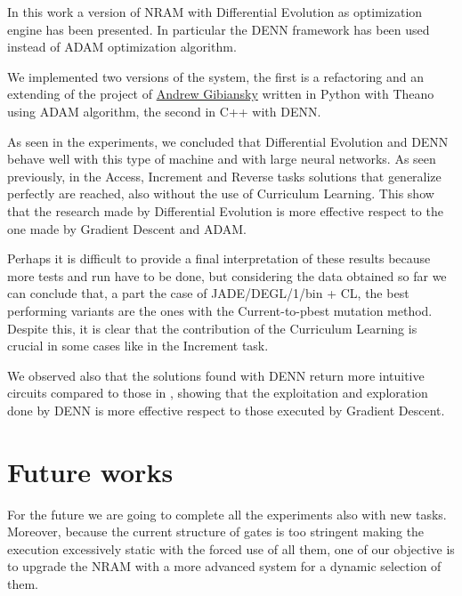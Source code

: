 

In this work a version of NRAM with Differential Evolution as optimization engine has been presented. In particular the DENN framework has been used instead of ADAM optimization algorithm. 

We implemented two versions of the system, the first is a refactoring and an extending of the project of \hyperref[https://github.com/gibiansky/experiments/tree/master/nram]{Andrew Gibiansky} written in Python with Theano using ADAM algorithm, the second in C++ with DENN. 

As seen in the experiments, we concluded that Differential Evolution and DENN behave well with this type of machine and with large neural networks. As seen previously, in the Access, Increment and Reverse tasks solutions that generalize perfectly are reached, also without the use of Curriculum Learning. This show that the research made by Differential Evolution is more effective respect to the one made by Gradient Descent and ADAM. 

Perhaps it is difficult to provide a final interpretation of these results because more tests and run have to be done, but considering the data obtained so far we can conclude that, a part the case of JADE/DEGL/1/bin + CL, the best performing variants are the ones with the Current-to-pbest mutation method. Despite this, it is clear that the contribution of the Curriculum Learning is crucial in some cases like in the Increment task.

We observed also that the solutions found with DENN return more intuitive circuits compared to those in \cite{NRAM:2016}, showing that the exploitation and exploration done by DENN is more effective respect to those executed by Gradient Descent.

\section{Future works}
For the future we are going to complete all the experiments also with new tasks. Moreover, because the current structure of gates is too stringent making the execution excessively static with the forced use of all them, one of our objective is to upgrade the NRAM with a more advanced system for a dynamic selection of them.